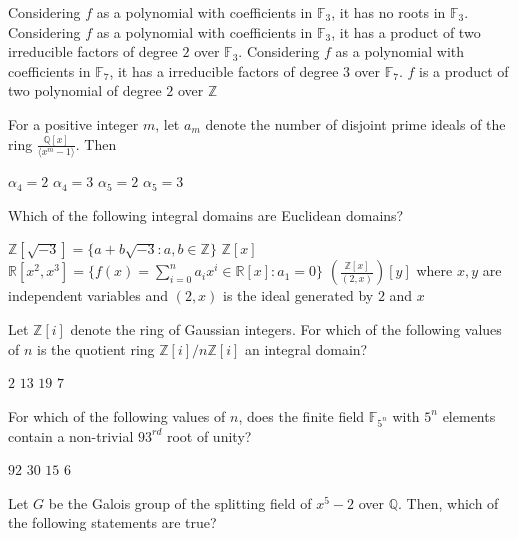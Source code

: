 \documentclass[10pt]{exam}
\begin{document}
\begin{questions}
\begin{checkboxes}
\choice Considering $f$ as a polynomial with coefficients in $\mathbb{F}_3$, it has no roots in $\mathbb{F}_3$.
\choice Considering $f$ as a polynomial with coefficients in $\mathbb{F}_3$, it has a product of two irreducible factors of degree $2$ over $\mathbb{F}_3$.
\choice Considering $f$ as a polynomial with coefficients in $\mathbb{F}_7$, it has a irreducible factors of degree $3$ over $\mathbb{F}_7$.
\choice $f$ is a product of two polynomial of degree $2$ over $\mathbb{Z}$
\end{checkboxes}

\question
For a positive integer $m$, let $a_m$ denote the number of disjoint prime ideals of the ring $\frac{\mathbb{Q}[x]}{\langle x^m-1 \rangle}$. Then

\begin{oneparcheckboxes}
\choice $\alpha_4=2$
\choice $\alpha_4=3$
\choice $\alpha_5=2$
\choice $\alpha_5=3$  
\end{oneparcheckboxes}

\question
Which of the following integral domains are Euclidean domains?

\begin{checkboxes}
\choice $\mathbb{Z}[\sqrt{-3}]=\{a+b\sqrt{-3}:a,b \in \mathbb{Z}\}$
\choice $\mathbb{Z}[x]$
\choice $\mathbb{R}[x^2,x^3]=\{f(x)= \sum_{i=0}^n a_ix^i \in \mathbb{R}[x]:a_1=0\}$
\choice $\left( \frac{\mathbb{Z}[x]}{(2,x)} \right)\!\![y]$ where $x,y$ are independent variables and $(2,x)$ is the ideal generated by $2$ and $x$
\end{checkboxes}

\question
Let $\mathbb{Z}[i]$ denote the ring of Gaussian integers. For which of the following values of $n$ is the quotient ring $\mathbb{Z}[i]/n \mathbb{Z}[i]$ an integral domain?

\begin{oneparcheckboxes}
\choice $2$
\choice $13$
\choice $19$
\choice $7$
\end{oneparcheckboxes}

\question
For which of the following values of $n$, does the finite field $\mathbb{F}_{5^n}$ with $5^n$ elements contain a non-trivial $93^{rd}$ root of unity?

\begin{oneparcheckboxes}
\choice $92$
\choice $30$
\choice $15$
\choice $6$
\end{oneparcheckboxes}


\question
Let $G$ be the Galois group of the splitting field of $x^5-2$ over $\mathbb{Q}$. Then, which of the following statements are true?


\end{questions}
\end{document}
